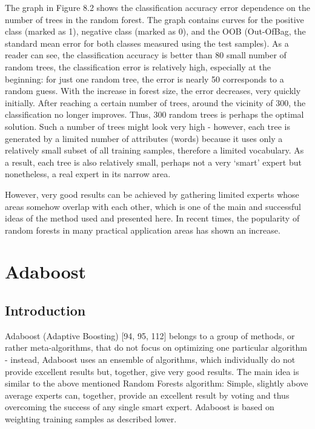 \documentclass[11pt,openany,executivepaper]{book}
\begin{document}
The graph in Figure 8.2 shows the classification accuracy error dependence
on the number of trees in the random forest. The graph contains curves for the
positive class (marked as 1), negative class (marked as 0), and the OOB (Out-OfBag, the standard mean error for both classes measured using the test samples).
As a reader can see, the classification accuracy is better than 80%
small number of random trees, the classification error is relatively high, especially at the beginning: for just one random tree, the error is nearly 50%
corresponds to a random guess. With the increase in forest size, the error decreases, very quickly initially. After reaching a certain number of trees, around
the vicinity of 300, the classification no longer improves. Thus, 300 random trees
is perhaps the optimal solution.
Such a number of trees might look very high - however, each tree is generated
by a limited number of attributes (words) because it uses only a relatively small
subset of all training samples, therefore a limited vocabulary. As a result, each
tree is also relatively small, perhaps not a very ‘smart’ expert but nonetheless, a
real expert in its narrow area.

However, very good results can be achieved by gathering limited experts
whose areas somehow overlap with each other, which is one of the main and
successful ideas of the method used and presented here. In recent times, the
popularity of random forests in many practical application areas has shown an
increase.

\chapter{Adaboost} %

\section{Introduction}
Adaboost (Adaptive Boosting) [94, 95, 112] belongs to a group of methods, or
rather meta-algorithms, that do not focus on optimizing one particular algorithm
- instead, Adaboost uses an ensemble of algorithms, which individually do not
provide excellent results but, together, give very good results. The main idea
is similar to the above mentioned Random Forests algorithm: Simple, slightly
above average experts can, together, provide an excellent result by voting and
thus overcoming the success of any single smart expert. Adaboost is based on
weighting training samples as described lower.
\end{document}
